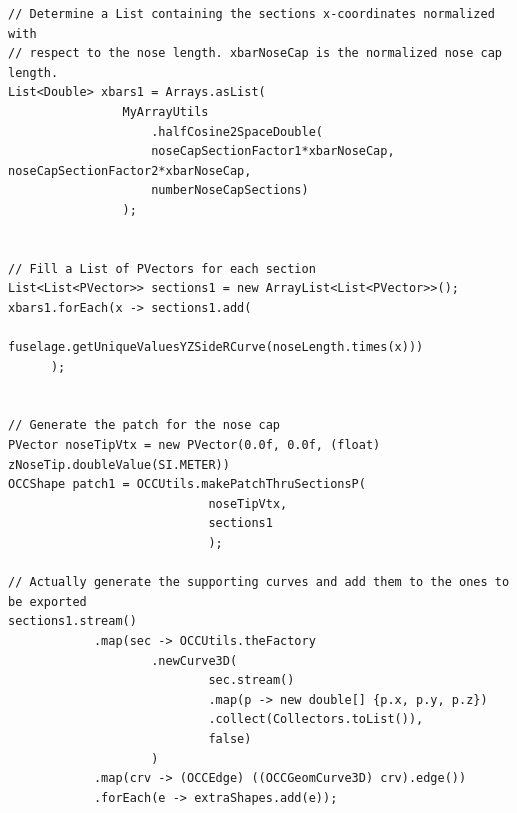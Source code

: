 %
\bigskip
\begin{lstlisting}[caption={Nose cap shapes building process}, captionpos=b, tabsize=2, label={lst:NoseCapCreation}]
// Determine a List containing the sections x-coordinates normalized with  
// respect to the nose length. xbarNoseCap is the normalized nose cap length. 
List<Double> xbars1 = Arrays.asList(
				MyArrayUtils
					.halfCosine2SpaceDouble(
					noseCapSectionFactor1*xbarNoseCap, noseCapSectionFactor2*xbarNoseCap, 
					numberNoseCapSections) 
				);
				

// Fill a List of PVectors for each section
List<List<PVector>> sections1 = new ArrayList<List<PVector>>();
xbars1.forEach(x -> sections1.add(
				 fuselage.getUniqueValuesYZSideRCurve(noseLength.times(x)))
	  );
	  
	
// Generate the patch for the nose cap
PVector noseTipVtx = new PVector(0.0f, 0.0f, (float) zNoseTip.doubleValue(SI.METER))	  
OCCShape patch1 = OCCUtils.makePatchThruSectionsP(
							noseTipVtx,
							sections1
							);
						
// Actually generate the supporting curves and add them to the ones to be exported
sections1.stream()
			.map(sec -> OCCUtils.theFactory
					.newCurve3D(
							sec.stream()
							.map(p -> new double[] {p.x, p.y, p.z})
							.collect(Collectors.toList()),
							false)
					)
			.map(crv -> (OCCEdge) ((OCCGeomCurve3D) crv).edge())
			.forEach(e -> extraShapes.add(e));			
\end{lstlisting}
%

